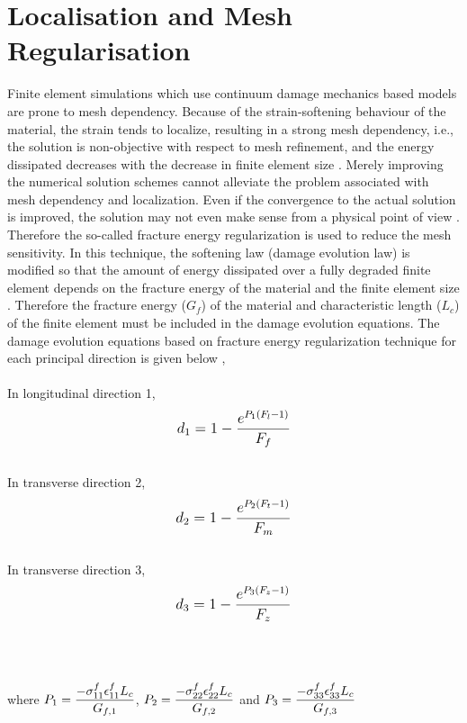 \documentclass[12pt,a4paper,twoside,openright]{report}
\begin{document}
\section{Localisation and Mesh Regularisation}\label{Mesh Regularisation}
\indent\indent\indent Finite element simulations which use continuum damage mechanics based models are prone to mesh dependency.  Because of the strain-softening behaviour of the material, the strain tends to localize, resulting in a strong mesh dependency, i.e., the solution is non-objective with respect to mesh refinement, and the energy dissipated decreases with the decrease in finite element size \citep{lapczyk2007progressive}. Merely improving the numerical solution schemes cannot alleviate the problem associated with mesh dependency and localization. Even if the convergence to the actual solution is improved, the solution may not even make sense from a physical point of view \citep{peerlings1999enhanced}. Therefore the so-called fracture energy regularization is used to reduce the mesh sensitivity. In this technique, the softening law (damage evolution law) is modified so that the amount of energy dissipated over a fully degraded finite element depends on the fracture energy of the material and the finite element size \citep{cervera2006smeared}. Therefore the fracture energy ($G_f$) of the material and characteristic length ($L_{c}$) of the finite element must be included in the damage evolution equations. The damage evolution equations based on fracture energy regularization technique for each principal direction is given below \citep{wang2009three}, \\
\\
In longitudinal direction 1,
\begin{equation}
\label{d1}
\mathlarger{d_{1} = 1 - \frac{e^{P_{1}(F_{l} - 1)}}{F_{f}}}
\end{equation}
\\
In transverse direction 2,
\begin{equation}
\label{d2}  
\mathlarger{d_{2} = 1 - \frac{e^{P_{2}(F_{t} - 1)}}{F_{m}}}
\end{equation}
\\
In transverse direction 3,
\begin{equation}
\label{d3} 
\mathlarger{d_{3} = 1 - \frac{e^{P_{3}(F_{z} - 1)}}{F_{z}}}
\end{equation}
\\
\\
\\
where $\mathlarger{P_{1} = \frac{-\sigma_{11}^{f}\epsilon_{11}^{f}L_{c}}{G_{f,1}}}$, $\mathlarger{P_{2} = \frac{-\sigma_{22}^{f}\epsilon_{22}^{f}L_{c}}{G_{f,2}}}$ and $\mathlarger{P_{3} = \frac{-\sigma_{33}^{f}\epsilon_{33}^{f}L_{c}}{G_{f,3}}}$ 
\end{document}
